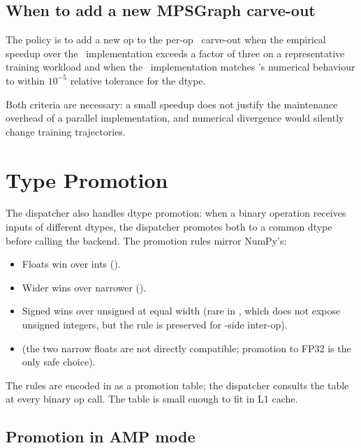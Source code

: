 \subsection{When to add a new MPSGraph carve-out}
\label{ssec:backend_dispatch:add_mpsgraph}

The policy is to add a new op to the per-op \MPSGraph\ carve-out
when the empirical speedup over the \MLX\ implementation exceeds a
factor of three on a representative training workload and when the
\MPSGraph\ implementation matches \MLX's numerical behaviour to
within $10^{-5}$ relative tolerance for the dtype.

Both criteria are necessary: a small speedup does not justify the
maintenance overhead of a parallel implementation, and numerical
divergence would silently change training trajectories.

\section{Type Promotion}
\label{sec:backend_dispatch:dtype_promo}

The dispatcher also handles dtype promotion: when a binary operation
receives inputs of different dtypes, the dispatcher promotes both
to a common dtype before calling the backend. The promotion rules
mirror NumPy's:

\begin{itemize}
  \item Floats win over ints ().
  \item Wider wins over narrower
    ().
  \item Signed wins over unsigned at equal width (rare in \Lucid,
    which does not expose unsigned integers, but the rule is
    preserved for \MLX-side inter-op).
  \item {} (the two narrow
    floats are not directly compatible; promotion to FP32 is the
    only safe choice).
\end{itemize}

The rules are encoded in
 as a promotion table; the
dispatcher consults the table at every binary op call. The table is
small enough to fit in L1 cache.

\subsection{Promotion in AMP mode}
\label{ssec:backend_dispatch:amp_promo}


